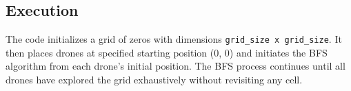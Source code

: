 \subsection{Execution}

The code initializes a grid of zeros with dimensions \texttt{grid\_size x grid\_size}. It then places drones at specified starting position (0, 0) and initiates the BFS algorithm from each drone's initial position. The BFS process continues until all drones have explored the grid exhaustively without revisiting any cell.

